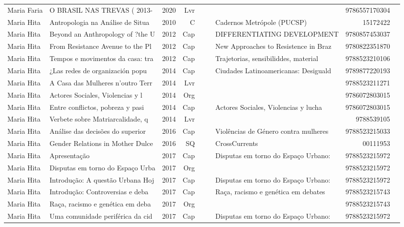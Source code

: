 \documentclass[12pt,brazil]{article}\usepackage[]{graphicx}\usepackage[]{xcolor}
\begin{document}
\begin{longtable}{lllrrllrr}
Maria Faria & O BRASIL NAS TREVAS ( 2013- & 2020 & Lvr &  &  &  & 9786557170304 \\
Maria Hita & Antropologia na Análise de Situa & 2010 & C &  &  & Cadernos Metrópole (PUCSP) & 15172422 \\
Maria Hita & Beyond an Anthropology of ?the U & 2012 & Cap &  &  & DIFFERENTIATING DEVELOPMENT & 9780857453037 \\
Maria Hita & From Resistance Avenue to the Pl & 2012 & Cap &  &  & New Approaches to Resistence in Braz & 9780822351870 \\
Maria Hita & Tempos e movimentos da casa: tra & 2012 & Cap &  &  & Trajetorias, sensibiliddes, material & 9788523210106 \\
Maria Hita & ¿Las redes de organización popu & 2014 & Cap &  &  & Ciudades Latinoamericanas: Desiguald & 9789877220193 \\
Maria Hita & A Casa das Mulheres n’outro Terr & 2014 & Lvr &  &  &  & 9788523211271 \\
Maria Hita & Actores Sociales, Violencias y l & 2014 & Org &  &  &  & 9786072803015 \\
Maria Hita & Entre conflictos, pobreza y pasi & 2014 & Cap &  &  & Actores Sociales, Violencias y lucha & 9786072803015 \\
Maria Hita & Verbete sobre Matriarcalidade, q & 2014 & Lvr &  &  &  & 9788539105 \\
Maria Hita & Análise das decisões do superior & 2016 & Cap &  &  & Violências de Género contra mulheres & 9788523215033 \\
Maria Hita & Gender Relations in Mother Dulce & 2016 & SQ &  &  & CrossCurrents & 00111953 \\
Maria Hita & Apresentação & 2017 & Cap &  &  & Disputas em torno do Espaço Urbano:  & 9788523215972 \\
Maria Hita & Disputas em torno do Espaço Urba & 2017 & Org &  &  &  & 9788523215972 \\
Maria Hita & Introdução: A questão Urbana Hoj & 2017 & Cap &  &  & Disputas em torno do Espaço Urbano:  & 9788523215972 \\
Maria Hita & Introdução: Controversias e deba & 2017 & Cap &  &  & Raça, racismo e genética em debates  & 9788523215743 \\
Maria Hita & Raça, racismo e genética em deba & 2017 & Org &  &  &  & 9788523215743 \\
Maria Hita & Uma comunidade periférica da cid & 2017 & Cap &  &  & Disputas em torno do Espaço Urbano:  & 9788523215972 \\

\end{longtable}
\end{document}
